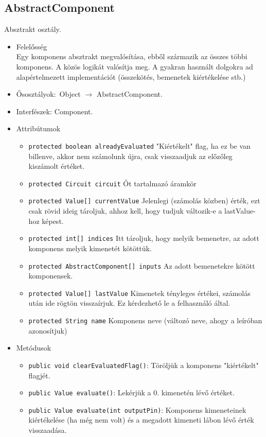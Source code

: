 \subsection{AbstractComponent}
Absztrakt osztály.
\begin{itemize}
\item Felelősség\\
Egy komponens absztrakt megvalósítása, ebből származik az összes többi  komponens. A közös logikát valósítja meg. A gyakran használt dolgokra  ad alapértelmezett implementációt (összekötés, bemenetek kiértékelése stb.)
\item Ősosztályok:\ Object $\rightarrow{}$ AbstractComponent.
\item Interfészek: Component.
\item Attribútumok $\ $
\begin{itemize}
	\item \texttt{protected boolean alreadyEvaluated} "Kiértékelt" flag, ha ez be van billenve, akkor nem számolunk újra, csak visszaadjuk az előzőleg kiszámolt értéket.
	\item \texttt{protected Circuit circuit} Őt tartalmazó áramkör
	\item \texttt{protected Value[] currentValue} Jelenlegi (számolás közben) érték, ezt csak rövid ideig tároljuk, ahhoz kell, hogy tudjuk változik-e a lastValue-hoz képest.
	\item \texttt{protected int[] indices} Itt tároljuk, hogy melyik bemenetre, az adott komponens melyik kimenetét kötöttük.
	\item \texttt{protected AbstractComponent[] inputs} Az adott bemenetekre kötött komponensek.
	\item \texttt{protected Value[] lastValue} Kimenetek tényleges értékei, számolás után ide rögtön visszaírjuk. Ez kérdezhető le a felhasználó által.
	\item \texttt{protected String name} Komponens neve (változó neve, ahogy a leíróban azonosítjuk)
\end{itemize}
\item Metódusok$\ $
\begin{itemize}
	\item \texttt{public void clearEvaluatedFlag()}: Töröljük a komponens "kiértékelt" flagjét.
	\item \texttt{public Value evaluate()}: Lekérjük a 0. kimenetén lévő értéket.
	\item \texttt{public Value evaluate(int outputPin)}: Komponens kimeneteinek kiértékelése (ha még nem volt) és a megadott  kimeneti lábon lévő érték visszaadása.

\end{itemize}
\end{itemize}
